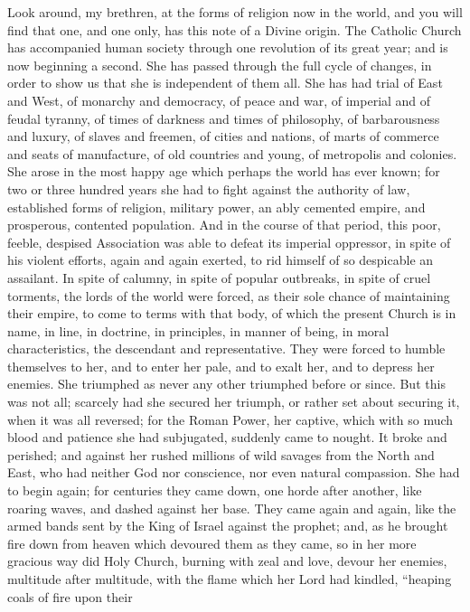 Look around, my brethren, at the forms of religion now in the
world, and you will find that one, and one only, has this note of a
Divine origin. The Catholic Church has accompanied human society
through one revolution of its great year; and is now beginning a
second. She has passed through the full cycle of changes, in order to
show us that she is independent of them all. She has had trial of East
and West, of monarchy and democracy, of peace and war, of imperial and
of feudal tyranny, of times of darkness and times of philosophy, of
barbarousness and luxury, of slaves and freemen, of cities and
nations, of marts of commerce and seats of manufacture, of old
countries and young, of metropolis and colonies. She arose in the most
happy age which perhaps the world has ever known; for two or three
hundred years she had to fight against the authority of law,
established forms of religion, military power, an ably cemented
empire, and prosperous, contented population. And in the course of
that period, this poor, feeble, despised Association was able to
defeat its imperial oppressor, in spite of his violent efforts, again
and again exerted, to rid himself of so despicable an assailant. In
spite of calumny, in spite of popular outbreaks, in spite of cruel
torments, the lords of the world were forced, as their sole chance of
maintaining their empire, to come to terms with that body, of which
the present Church is in name, in line, in doctrine, in principles, in
manner of being, in moral characteristics, the descendant and
representative. They were forced to humble themselves to her, and to
enter her pale, and to exalt her, and to depress her enemies. She
triumphed as never any other triumphed before or since. But this was
not all; scarcely had she secured her triumph, or rather set about
securing it, when it was all reversed; for the Roman Power, her
captive, which with so much blood and patience she had subjugated,
suddenly came to nought. It broke and perished; and against her rushed
millions of wild savages from the North and East, who had neither God
nor conscience, nor even natural compassion. She had to begin again;
for centuries they came down, one horde after another, like roaring
waves, and dashed against her base. They came again and again, like
the armed bands sent by the King of Israel against the prophet; and,
as he brought fire down from heaven which devoured them as they came,
so in her more gracious way did Holy Church, burning with zeal and
love, devour her enemies, multitude after multitude, with the flame
which her Lord had kindled, ``heaping coals of fire upon their
